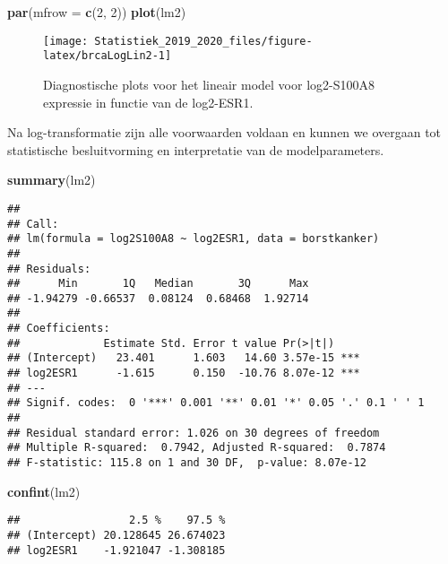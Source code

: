 \documentclass[12pt,dutch,coursenotes]{book}
\newenvironment{Shaded}{\begin{snugshade}}{\end{snugshade}}
\newcommand{\KeywordTok}[1]{\textcolor[rgb]{0.13,0.29,0.53}{\textbf{#1}}}
\newcommand{\DataTypeTok}[1]{\textcolor[rgb]{0.13,0.29,0.53}{#1}}
\newcommand{\DecValTok}[1]{\textcolor[rgb]{0.00,0.00,0.81}{#1}}
\newcommand{\NormalTok}[1]{#1}
\theoremstyle{definition}
\theoremstyle{definition}
\theoremstyle{definition}
\theoremstyle{remark}
\begin{document}
\begin{Shaded}
\begin{Highlighting}[]
\KeywordTok{par}\NormalTok{(}\DataTypeTok{mfrow =} \KeywordTok{c}\NormalTok{(}\DecValTok{2}\NormalTok{, }\DecValTok{2}\NormalTok{))}
\KeywordTok{plot}\NormalTok{(lm2)}
\end{Highlighting}
\end{Shaded}

\begin{figure}

{\centering \texttt{[image: Statistiek\_2019\_2020\_files/figure-latex/brcaLogLin2-1]} 

}

\caption{Diagnostische plots voor het lineair model voor log2-S100A8 expressie in functie van de log2-ESR1.}\label{fig:brcaLogLin2}
\end{figure}

Na log-transformatie zijn alle voorwaarden voldaan en kunnen we overgaan
tot statistische besluitvorming en interpretatie van de modelparameters.

\begin{Shaded}
\begin{Highlighting}[]
\KeywordTok{summary}\NormalTok{(lm2)}
\end{Highlighting}
\end{Shaded}

\begin{verbatim}
## 
## Call:
## lm(formula = log2S100A8 ~ log2ESR1, data = borstkanker)
## 
## Residuals:
##      Min       1Q   Median       3Q      Max 
## -1.94279 -0.66537  0.08124  0.68468  1.92714 
## 
## Coefficients:
##             Estimate Std. Error t value Pr(>|t|)    
## (Intercept)   23.401      1.603   14.60 3.57e-15 ***
## log2ESR1      -1.615      0.150  -10.76 8.07e-12 ***
## ---
## Signif. codes:  0 '***' 0.001 '**' 0.01 '*' 0.05 '.' 0.1 ' ' 1
## 
## Residual standard error: 1.026 on 30 degrees of freedom
## Multiple R-squared:  0.7942, Adjusted R-squared:  0.7874 
## F-statistic: 115.8 on 1 and 30 DF,  p-value: 8.07e-12
\end{verbatim}

\begin{Shaded}
\begin{Highlighting}[]
\KeywordTok{confint}\NormalTok{(lm2)}
\end{Highlighting}
\end{Shaded}

\begin{verbatim}
##                 2.5 %    97.5 %
## (Intercept) 20.128645 26.674023
## log2ESR1    -1.921047 -1.308185
\end{verbatim}
\end{document}
